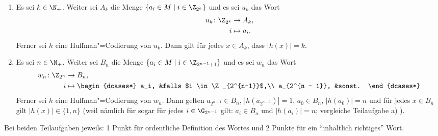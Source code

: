 \documentclass[12pt]{article}
\begin{document}
\begin{loesung}
  \begin{enumerate}
    \item Es sei $k \in \N_+$. Weiter sei $A_k$ die Menge $\{a_i \in M \mid i \in \Z_{2^k}\}$ und es sei $u_k$ das Wort
          \begin{align*}
            u_k \colon \Z_{2^k} &\to     A_k,\\
                              i &\mapsto a_i.
          \end{align*}
          Ferner sei $h$ eine Huffman"=Codierung von $u_k$. Dann gilt für jedes $x \in A_k$, dass $|h(x)| = k$.
    \item Es sei $n \in \N_+$. Weiter sei $B_n$ die Menge $\{a_i \in M \mid i \in \Z_{2^{n-1} + 1}\}$ und es sei $w_n$ das Wort
          \begin{align*}
            w_n \colon \Z_{2^n} &\to     B_n,\\
                              i &\mapsto \begin{dcases*}
                                           a_i,           &falls $i \in \Z_{2^{n-1}}$,\\ %
                                           a_{2^{n - 1}}, &sonst. %
                                         \end{dcases*}
          \end{align*}
          Ferner sei $h$ eine Huffman"=Codierung von $w_n$. Dann gelten $a_{2^{n-1}} \in B_n$, $|h(a_{2^{n-1}})| = 1$, $a_0 \in B_n$, $|h(a_0)| = n$ und für jedes $x \in B_n$ gilt $|h(x)| \in \{1,n\}$ (weil nämlich für sogar für jedes $i\in\G_{2^{n-1}}$ gilt: $a_i\in B_n$ und $|h(a_i)|=n$; vergleiche Teilaufgabe a) ).
  \end{enumerate}

  \begin{korrektur}
    Bei beiden Teilaufgaben jeweils: 1 Punkt für ordentliche
    Definition des Wortes und 2 Punkte für ein "`inhaltlich
    richtiges"' Wort.
  \end{korrektur}
\end{loesung}

\end{document}
